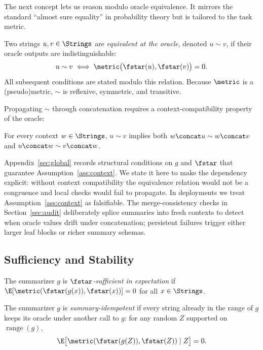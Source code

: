 The next concept lets us reason modulo oracle equivalence. It mirrors the standard ``almost sure equality'' in probability theory but is tailored to the task metric.

\begin{definition}\label{def:oracle-equivalence}
Two strings $u, v \in \Strings$ are \emph{equivalent at the oracle}, denoted $u \sim v$, if their oracle outputs are indistinguishable:
\[
u \sim v \;\Longleftrightarrow\; \metric\big(\fstar(u), \fstar(v)\big) = 0.
\]
All subsequent conditions are stated modulo this relation. Because $\metric$ is a (pseudo)metric, $\sim$ is reflexive, symmetric, and transitive.
\end{definition}

Propagating $\sim$ through concatenation requires a context-compatibility property of the oracle:

\begin{assumption}\label{ass:context}
For every context $w \in \Strings$, $u \sim v$ implies both $w \concat u \sim w \concat v$ and $u \concat w \sim v \concat w$.
\end{assumption}

Appendix~\ref{sec:global} records structural conditions on $g$ and $\fstar$ that guarantee Assumption~\ref{ass:context}. We state it here to make the dependency explicit: without context compatibility the equivalence relation would not be a congruence and local checks would fail to propagate. In deployments we treat Assumption~\ref{ass:context} as falsifiable. The merge-consistency checks in Section~\ref{sec:audit} deliberately splice summaries into fresh contexts to detect when oracle values drift under concatenation; persistent failures trigger either larger leaf blocks or richer summary schemas.

\subsection{Sufficiency and Stability}

\begin{definition}\label{def:expect-suff}
The summarizer $g$ is \emph{$\fstar$-sufficient in expectation} if $\E[\metric(\fstar(g(x)), \fstar(x))] = 0$ for all $x \in \Strings$.
\end{definition}

\begin{definition}\label{def:resum-stable}
The summarizer $g$ is \emph{summary-idempotent} if every string already in the range of $g$ keeps its oracle under another call to $g$: for any random $Z$ supported on $\operatorname{range}(g)$,
\[
\E\big[\metric(\fstar(g(Z)), \fstar(Z)) \mid Z\big] = 0.
\]
\end{definition}

